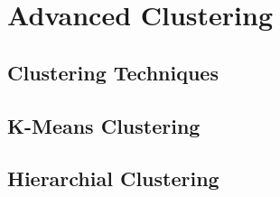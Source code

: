\chapter{Advanced Clustering}
\section{Clustering Techniques}
\section{K-Means Clustering}
\section{Hierarchial Clustering}